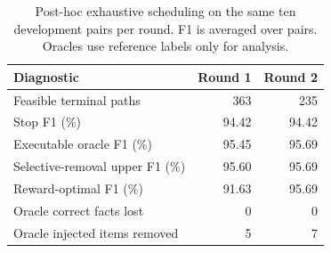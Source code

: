 \begin{table}[t]
\centering
\caption{Post-hoc exhaustive scheduling on the same ten development pairs per round. F1 is averaged over pairs. Oracles use reference labels only for analysis.}
\label{tab:offline_loop_ceiling}
\footnotesize
\begin{tabular}{lrr}
\toprule
Diagnostic & Round 1 & Round 2 \\
\midrule
Feasible terminal paths & 363 & 235 \\
Stop F1 (\%) & 94.42 & 94.42 \\
Executable oracle F1 (\%) & 95.45 & 95.69 \\
Selective-removal upper F1 (\%) & 95.60 & 95.69 \\
Reward-optimal F1 (\%) & 91.63 & 95.69 \\
Oracle correct facts lost & 0 & 0 \\
Oracle injected items removed & 5 & 7 \\
\bottomrule
\end{tabular}
\end{table}
